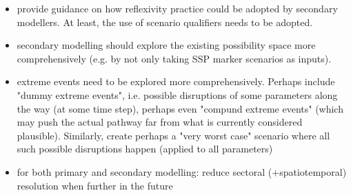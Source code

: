 \documentclass{article}
\begin{document}
\begin{refsection}
\begin{itemize}
    \item provide guidance on how reflexivity practice could be adopted by secondary modellers. At least, the use of scenario qualifiers needs to be adopted.
    \item secondary modelling should explore the existing possibility space more comprehensively (e.g. by not only taking SSP marker scenarios as inputs).
    \item extreme events need to be explored more comprehensively. Perhaps include "dummy extreme events", i.e. possible disruptions of some parameters along the way (at some time step), perhaps even "compund extreme events" (which may push the actual pathway far from what is currently considered plausible). Similarly, create perhaps a "very worst case" scenario where all such possible disruptions happen (applied to all parameters)
    \item for both primary and secondary modelling: reduce sectoral (+spatiotemporal) resolution when further in the future
\end{itemize}

\newrefcontext[sorting=nyt] %
\printbibliography[heading = bibintoc] %

\end{refsection}

%
%
%
%
%
\end{document}
